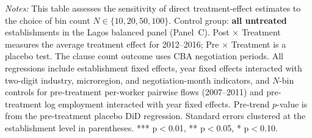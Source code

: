 \begin{table}[H]
\begin{threeparttable}
\begin{tablenotes}
\item \textit{Notes:} This table assesses the sensitivity of direct treatment-effect estimates to the choice of bin count $N \in \{10, 20, 50, 100\}$. Control group: \textbf{all untreated} establishments in the Lagos balanced panel (Panel~C). Post $\times$ Treatment measures the average treatment effect for 2012--2016; Pre $\times$ Treatment is a placebo test. The clause count outcome uses CBA negotiation periods. All regressions include establishment fixed effects, year fixed effects interacted with two-digit industry, microregion, and negotiation-month indicators, and $N$-bin controls for pre-treatment per-worker pairwise flows (2007--2011) and pre-treatment log employment interacted with year fixed effects. Pre-trend $p$-value is from the pre-treatment placebo DiD regression. Standard errors clustered at the establishment level in parentheses. *** p$<$0.01, ** p$<$0.05, * p$<$0.10.
\end{tablenotes}
\end{threeparttable}
\end{table}